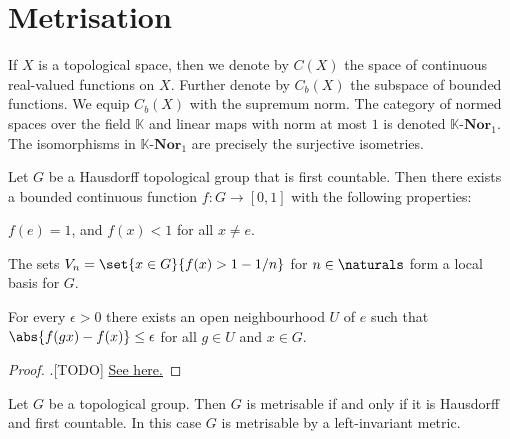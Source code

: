 \documentclass[article, a4paper, 11pt, oneside]{memoir}
\numberwithin{equation}{chapter}
\begin{document}


\chapter{Metrisation}

\newcommand{\cat}[1]{\mathcal{#1}}
\newcommand{\scat}[1]{\mathbf{#1}} %
\newcommand{\ncat}[1]{\mathbf{#1}} %

\newcommand{\scatC}{\scat{C}}

\newcommand{\catNor}[1]{{#1\text{-}\scat{Nor}}}
\newcommand{\catNorReal}{\catNor{\reals}}

\newcommand{\field}{\mathbb{K}}

If $X$ is a topological space, then we denote by $C(X)$ the space of continuous real-valued functions on $X$. Further denote by $C_b(X)$ the subspace of bounded functions. We equip $C_b(X)$ with the supremum norm. The category of normed spaces over the field $\field$ and linear maps with norm at most $1$ is denoted $\catNor{\field}_1$. The isomorphisms in $\catNor{\field}_1$ are precisely the surjective isometries.

\begin{lemma}
    \label{thm:birkhoff-kakutani-lemma}
    Let $G$ be a Hausdorff topological group that is first countable. Then there exists a bounded continuous function $f \colon G \to [0,1]$ with the following properties:
    \begin{enumlem}
        \item \label{enum:birkhoff-kakutani-lemma-unique-maximum} $f(e) = 1$, and $f(x) < 1$ for all $x \neq e$.
        \item \label{enum:birkhoff-kakutani-lemma-nhood-basis} The sets $V_n = \set{x \in G}{f(x) > 1-1/n}$ for $n \in \naturals$ form a local basis for $G$.
        \item \label{enum:birkhoff-kakutani-lemma-uniform-continuity} For every $\epsilon > 0$ there exists an open neighbourhood $U$ of $e$ such that $\abs{f(gx) - f(x)} \leq \epsilon$ for all $g \in U$ and $x \in G$.
    \end{enumlem}
\end{lemma}

\begin{proof}
    .[TODO] \href{https://terrytao.wordpress.com/2011/05/17/the-birkhoff-kakutani-theorem/}{See here.}
\end{proof}


\begin{theorem}
    Let $G$ be a topological group. Then $G$ is metrisable if and only if it is Hausdorff and first countable. In this case $G$ is metrisable by a left-invariant metric.
\end{theorem}
\end{document}
